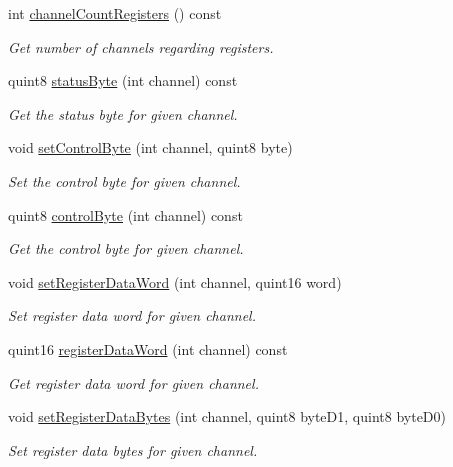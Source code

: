 \begin{DoxyCompactItemize}
int \hyperlink{classmdt_device_modbus_wago_module_a335047318b1be765a12002bdbd04988b}{channelCountRegisters} () const 
\begin{DoxyCompactList}\small\item\em Get number of channels regarding registers. \end{DoxyCompactList}\item 
quint8 \hyperlink{classmdt_device_modbus_wago_module_abe92a4c761a0ccf4d31312eda0521b11}{statusByte} (int channel) const 
\begin{DoxyCompactList}\small\item\em Get the status byte for given channel. \end{DoxyCompactList}\item 
void \hyperlink{classmdt_device_modbus_wago_module_aba44d9749bb81fe2659699ae3c50842c}{setControlByte} (int channel, quint8 byte)
\begin{DoxyCompactList}\small\item\em Set the control byte for given channel. \end{DoxyCompactList}\item 
quint8 \hyperlink{classmdt_device_modbus_wago_module_a668b35f8174b6a04cb703ef0e9b56128}{controlByte} (int channel) const 
\begin{DoxyCompactList}\small\item\em Get the control byte for given channel. \end{DoxyCompactList}\item 
void \hyperlink{classmdt_device_modbus_wago_module_a614e6c3b3b0e832202eb0a1082f53b0a}{setRegisterDataWord} (int channel, quint16 word)
\begin{DoxyCompactList}\small\item\em Set register data word for given channel. \end{DoxyCompactList}\item 
quint16 \hyperlink{classmdt_device_modbus_wago_module_a0f0ce9200c967775834b05649f8e499d}{registerDataWord} (int channel) const 
\begin{DoxyCompactList}\small\item\em Get register data word for given channel. \end{DoxyCompactList}\item 
void \hyperlink{classmdt_device_modbus_wago_module_ab1b83fbb869c62c46e21cdac54ff9458}{setRegisterDataBytes} (int channel, quint8 byteD1, quint8 byteD0)
\begin{DoxyCompactList}\small\item\em Set register data bytes for given channel. \end{DoxyCompactList}\item 

\end{DoxyCompactItemize}
